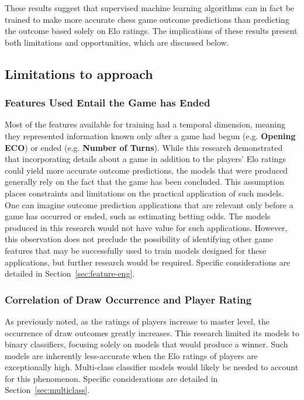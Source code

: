 \documentclass[12pt]{article}
\begin{document}
These results suggest that supervised machine learning algorithms can in fact be trained to make more accurate chess game outcome predictions than predicting the outcome based solely on Elo ratings. The implications of these results present both limitations and opportunities, which are discussed below.

\subsection{Limitations to approach}

\subsubsection{Features Used Entail the Game has Ended}
Most of the features available for training had a temporal dimension, meaning they represented information known only after a game had begun (e.g. \textbf{Opening ECO}) or ended (e.g. \textbf{Number of Turns}). While this research demonstrated that incorporating details about a game in addition to the players' Elo ratings could yield more accurate outcome predictions, the models that were produced generally rely on the fact that the game has been concluded. This assumption places constraints and limitations on the practical application of such models. One can imagine outcome prediction applications that are relevant only before a game has occurred or ended, such as estimating betting odds. The models produced in this research would not have value for such applications. However, this observation does not preclude the possibility of identifying other game features that may be successfully used to train models designed for these applications, but further research would be required. Specific considerations are detailed in Section~\ref{sec:feature-eng}.

\subsubsection{Correlation of Draw Occurrence and Player Rating}
As previously noted, as the ratings of players increase to master level, the occurrence of draw outcomes greatly increases. This research limited its models to binary classifiers, focusing solely on models that would produce a winner. Such models are inherently less-accurate when the Elo ratings of players are exceptionally high. Multi-class classifier models would likely be needed to account for this phenomenon. Specific considerations are detailed in Section~\ref{sec:multiclass}.
\end{document}
